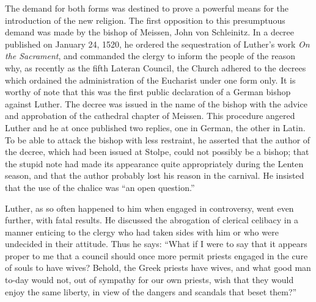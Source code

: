 The demand for both forms was destined to prove a powerful
means for the introduction of the new religion.
The first opposition to this presumptuous demand was made by
the bishop of Meissen, John von Schleinitz. In a decree published on
January 24, 1520, he ordered the sequestration of Luther’s work
\textit{On the Sacrament}, and commanded the clergy to inform the people
of the reason why, as recently as the fifth Lateran Council, the
Church adhered to the decrees which ordained the administration of
the Eucharist under one form only. It is worthy of note that this
was the first public declaration of a German bishop against Luther.
The decree was issued in the name of the bishop with the advice
and approbation of the cathedral chapter of Meissen. This procedure
angered Luther and he at once published two replies, one in German, the
other in Latin. To be able to attack the bishop with less
restraint, he asserted that the author of the decree, which had been
issued at Stolpe, could not possibly be a bishop; that the stupid note
had made its appearance quite appropriately during the Lenten
season, and that the author probably lost his reason in the carnival.
He insisted that the use of the chalice was “an open question.”

Luther, as so often happened to him when engaged in controversy,
went even further, with fatal results. He discussed the abrogation of
clerical celibacy in a manner enticing to the clergy who had taken
sides with him or who were undecided in their attitude. Thus he
says: “What if I were to say that it appears proper to me that a
council should once more permit priests engaged in the cure of souls
to have wives? Behold, the Greek priests have wives, and what good
man to-day would not, out of sympathy for our own priests, wish
that they would enjoy the same liberty, in view of the dangers and
scandals that beset them?”

